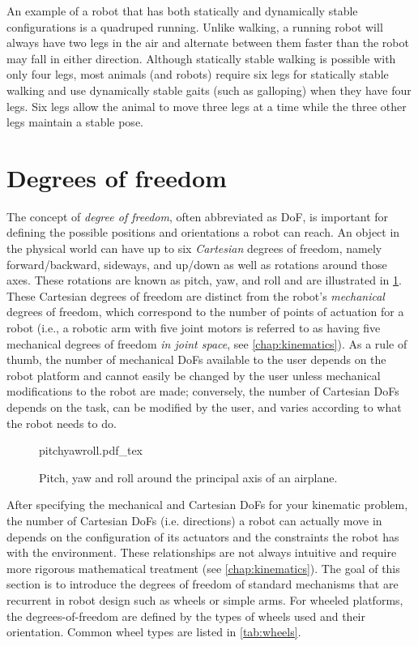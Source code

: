 An example of a robot that has both statically and dynamically stable configurations is a quadruped running. Unlike walking, a running robot will always have two legs in the air and alternate between them faster than the robot may fall in either direction. Although statically stable walking is possible with only four legs, most animals (and robots) require six legs for statically stable walking and use dynamically stable gaits (such as galloping) when they have four legs. Six legs allow the animal to move three legs at a time while the three other legs maintain a stable pose.


\section{Degrees of freedom}\label{sec:dof}

The concept of \textsl{degree of freedom}, often abbreviated as DoF, is important for defining the possible positions and orientations a robot can reach. An object in the physical world can have up to six \textsl{Cartesian} degrees of freedom, namely forward/backward, sideways, and up/down as well as rotations around those axes. These rotations are known as pitch, yaw, and roll and are illustrated in \cref{fig:pitchyawandroll}. These Cartesian degrees of freedom are distinct from the robot's \textsl{mechanical} degrees of freedom, which correspond to the number of points of actuation for a robot (i.e., a robotic arm with five joint motors is referred to as having five mechanical degrees of freedom \textsl{in joint space}, see \cref{chap:kinematics}).
As a rule of thumb, the number of mechanical DoFs available to the user depends on the robot platform and cannot easily be changed by the user unless mechanical modifications to the robot are made; conversely, the number of Cartesian DoFs depends on the task, can be modified by the user, and varies according to what the robot needs to do.

\begin{figure}
    \centering
    \def\svgwidth{\textwidth}
    {pitchyawroll.pdf_tex}
    \caption{Pitch, yaw and roll around the principal axis of an airplane.}
    \label{fig:pitchyawandroll}
\end{figure}

After specifying the mechanical and Cartesian DoFs for your kinematic problem, the number of Cartesian DoFs (i.e. directions) a robot can actually move in depends on the configuration of its actuators and the constraints the robot has with the environment. These relationships are not always intuitive and require more rigorous mathematical treatment (see \cref{chap:kinematics}). The goal of this section is to introduce the degrees of freedom of standard mechanisms that are recurrent in robot design such as wheels or simple arms. For wheeled platforms, the degrees-of-freedom are defined by the types of wheels used and their orientation. Common wheel types are listed in \cref{tab:wheels}.

